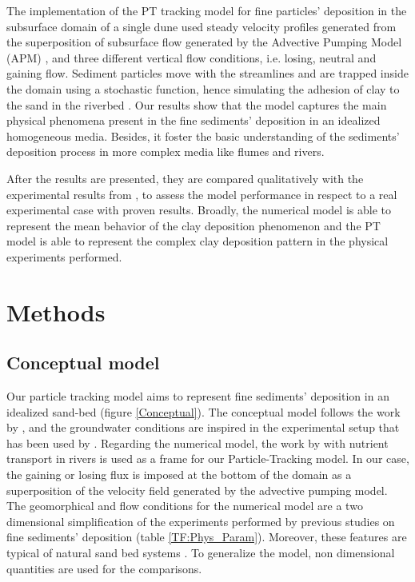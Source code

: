 \documentclass[draft,linenumbers]{agujournal2018}
\begin{document}
The implementation of the PT tracking model for fine particles' deposition in the subsurface domain of a single dune used steady velocity profiles generated from the superposition of subsurface flow generated by the Advective Pumping Model (APM) \citep{Elliott1997,Elliott1997b}, and three different vertical flow conditions, i.e. losing, neutral and gaining flow. Sediment particles move with the streamlines and are trapped inside the domain using a stochastic function, hence simulating the adhesion of clay to the sand in the riverbed \citep{Li2017}. Our results show that the model captures the main physical phenomena present in the fine sediments' deposition in an idealized homogeneous media. Besides, it foster the basic understanding of the sediments' deposition process in more complex media like flumes and rivers.

After the results are presented, they are compared qualitatively with the experimental results from \citet{Fox2014,Fox2018}, to assess the model performance in respect to a real experimental case with proven results. Broadly, the numerical model is able to represent the mean behavior of the clay deposition phenomenon and the PT model is able to represent the complex clay deposition pattern in the physical experiments performed. 

\section{Methods} \label{Methods}

\subsection{Conceptual model} \label{Conceptual_Model}

Our particle tracking model aims to represent fine sediments' deposition in an idealized sand-bed (figure \ref{Conceptual}). The conceptual model follows the work by \citet{Elliott1997,Elliott1997b,Packman2000,Packman2000a}, and the groundwater conditions are inspired in the experimental setup that has been used by \citet{Fox2014,Fox2018}. Regarding the numerical model, the work by \citet{Li2017} with nutrient transport in rivers is used as a frame for our Particle-Tracking model. In our case, the gaining or losing flux is imposed at the bottom of the domain as a superposition of the velocity field generated by the advective pumping model. The geomorphical and flow conditions for the numerical model are a two dimensional simplification of the experiments performed by previous studies on fine sediments' deposition \citep{Packman2000,Fox2014,Fox2018}(table \ref{TF:Phys_Param}). Moreover, these features are typical of natural sand bed systems \citep{Vanoni1974,Harvey2012,Worman2007,Hunken2007,Mutz2000,Mutz2003}. To generalize the model, non dimensional quantities are used for the comparisons.
\end{document}
